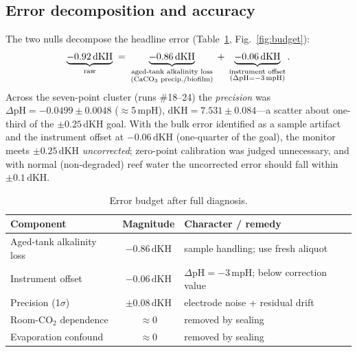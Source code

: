 \documentclass[11pt]{article}
\newcommand{\dpH}{\ensuremath{\Delta\mathrm{pH}}}
\newcommand{\dkh}{\ensuremath{\,\mathrm{dKH}}}
\newcommand{\co}{\ensuremath{\mathrm{CO_2}}}
\begin{document}
\subsection{Error decomposition and accuracy}
The two nulls decompose the headline error (Table~\ref{tab:budget},
Fig.~\ref{fig:budget}):
\begin{equation}
\underbrace{-0.92\dkh}_{\text{raw}} \;=\;
\underbrace{-0.86\dkh}_{\substack{\text{aged-tank alkalinity loss}\\(\ce{CaCO3}\text{ precip./biofilm})}}
\;+\;
\underbrace{-0.06\dkh}_{\substack{\text{instrument offset}\\(\dpH=-3\,\mathrm{mpH})}}.
\end{equation}
Across the seven-point cluster (runs \#18--24) the \emph{precision} was
$\dpH = -0.0499\pm0.0048$ ($\approx$5\,mpH), $\mathrm{dKH}=7.531\pm0.084$---a
scatter about one-third of the $\pm0.25\dkh$ goal. With the bulk error
identified as a sample artifact and the instrument offset at $-0.06\dkh$
(one-quarter of the goal), the monitor meets $\pm0.25\dkh$ \emph{uncorrected};
zero-point calibration was judged unnecessary, and with normal (non-degraded)
reef water the uncorrected error should fall within $\pm0.1\dkh$.

\begin{table}[t]
\centering
\caption{Error budget after full diagnosis.}
\label{tab:budget}
\footnotesize
\begin{tabular}{@{}lcl@{}}
\toprule
Component & Magnitude & Character / remedy \\
\midrule
Aged-tank alkalinity loss & $-0.86\dkh$ & sample handling; use fresh aliquot \\
Instrument offset & $-0.06\dkh$ & $\dpH=-3$\,mpH; below correction value \\
Precision (1$\sigma$) & $\pm0.08\dkh$ & electrode noise + residual drift \\
Room-\co{} dependence & $\approx 0$ & removed by sealing \\
Evaporation confound & $\approx 0$ & removed by sealing \\
\bottomrule
\end{tabular}
\end{table}
\end{document}
